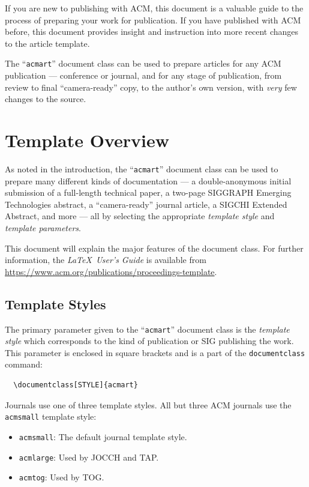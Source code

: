 \documentclass[manuscript,screen,review]{acmart}
\begin{document}
If you are new to publishing with ACM, this document is a valuable
guide to the process of preparing your work for publication. If you
have published with ACM before, this document provides insight and
instruction into more recent changes to the article template.

The ``\verb|acmart|'' document class can be used to prepare articles
for any ACM publication --- conference or journal, and for any stage
of publication, from review to final ``camera-ready'' copy, to the
author's own version, with {\itshape very} few changes to the source.

\section{Template Overview}
As noted in the introduction, the ``\verb|acmart|'' document class can
be used to prepare many different kinds of documentation --- a
double-anonymous initial submission of a full-length technical paper, a
two-page SIGGRAPH Emerging Technologies abstract, a ``camera-ready''
journal article, a SIGCHI Extended Abstract, and more --- all by
selecting the appropriate {\itshape template style} and {\itshape
  template parameters}.

This document will explain the major features of the document
class. For further information, the {\itshape \LaTeX\ User's Guide} is
available from
\url{https://www.acm.org/publications/proceedings-template}.

\subsection{Template Styles}

The primary parameter given to the ``\verb|acmart|'' document class is
the {\itshape template style} which corresponds to the kind of publication
or SIG publishing the work. This parameter is enclosed in square
brackets and is a part of the {\verb|documentclass|} command:
\begin{verbatim}
  \documentclass[STYLE]{acmart}
\end{verbatim}

Journals use one of three template styles. All but three ACM journals
use the {\verb|acmsmall|} template style:
\begin{itemize}
\item {\texttt{acmsmall}}: The default journal template style.
\item {\texttt{acmlarge}}: Used by JOCCH and TAP.
\item {\texttt{acmtog}}: Used by TOG.
\end{itemize}
\end{document}
